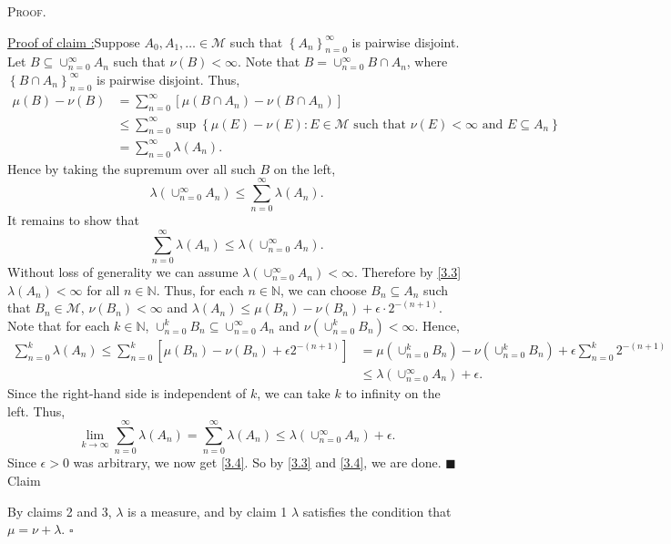 \documentclass[12pt]{article}
\newcounter{ProofCounter}
\newcounter{ClaimCounter}[ProofCounter]
\newenvironment{Proof}{\stepcounter{ProofCounter}\textsc{Proof.}}{\hfill$\square$}
\newenvironment{claim}[1]{\vspace{1mm}\stepcounter{ClaimCounter}\par\noindent\underline{\bf Claim \theClaimCounter:}\space#1}{}
\newenvironment{claimproof}[1]{\par\noindent\underline{Proof of claim \theClaimCounter:}\space#1}{\hfill $\blacksquare$ Claim \theClaimCounter}
\begin{document}
\begin{Proof}
\begin{claimproof}
Suppose $A_{0}, A_{1}, \hdots \in \mathcal{M}$ such that $\left\{ A_{n} \right\}_{n=0}^{\infty}$ is pairwise disjoint. Let $B \subseteq
\cup_{n=0}^{\infty} A_{n}$ such that $\nu(B) < \infty$. Note that $B = \cup_{n=0}^{\infty}B\cap A_{n}$, where $\left\{ B\cap A_{n}
\right\}_{n=0}^{\infty}$ is pairwise disjoint. Thus,
\begin{align*}
\mu(B) - \nu(B) & = \sum_{n=0}^{\infty}\left[ \mu(B\cap A_{n}) - \nu(B\cap A_{n}) \right] \\
& \leq \sum_{n=0}^{\infty}\sup\left\{ 
\mu(E) - \nu(E) : E \in \mathcal{M} \text{ such that } \nu(E) < \infty \text{ and } E \subseteq A_{n} \right\} \\
& = \sum_{n=0}^{\infty}\lambda(A_{n}).
\end{align*}
Hence by taking the supremum over all such $B$ on the left,
\begin{equation}
\lambda\left( \cup_{n=0}^{\infty}A_{n} \right) \leq \sum_{n=0}^{\infty}\lambda(A_{n}).
\label{3.3}
\end{equation}
It remains to show that 
\begin{equation}
\sum_{n=0}^{\infty}\lambda(A_{n}) \leq \lambda\left( \cup_{n=0}^{\infty} A_{n} \right).
\label{3.4}
\end{equation}
Without loss of generality we can assume $\lambda\left( \cup_{n=0}^{\infty}A_{n} \right) < \infty$. 
Therefore by \eqref{3.3} $\lambda(A_{n}) < \infty$ for all $n \in \mathbb{N}$. Thus, for each $n \in \mathbb{N}$, we can choose $B_{n}
\subseteq A_{n}$ such that $B_{n} \in \mathcal{M}$, $\nu(B_{n}) < \infty$ and $\lambda(A_{n}) \leq \mu(B_{n}) - \nu(B_{n}) + \epsilon\cdot
2^{-(n+1)}$. Note that for each $k \in \mathbb{N}$, $\cup_{n=0}^{k}B_{n} \subseteq \cup_{n=0}^{\infty}A_{n}$ and $\nu\left( \cup_{n=0}^{k}B_{n}
\right) < \infty$. Hence,
\begin{align*}
\sum_{n=0}^{k}\lambda(A_{n}) \leq \sum_{n=0}^{k}\left[ \mu(B_{n}) - \nu(B_{n}) + \epsilon 2^{-(n+1)}\right] & = \mu\left( \cup_{n=0}^{k}B_{n} \right)
- \nu\left( \cup_{n=0}^{k}B_{n} \right) + \epsilon\sum_{n=0}^{k}2^{-(n+1)} \\
& \leq \lambda\left( \cup_{n=0}^{\infty}A_{n} \right) + \epsilon.
\end{align*}
Since the right-hand side is independent of $k$, we can take $k$ to infinity on the left. Thus,
\[ \lim_{k\rightarrow\infty}\sum_{n=0}^{\infty}\lambda(A_{n}) = \sum_{n=0}^{\infty}\lambda(A_{n}) \leq \lambda\left( \cup_{n=0}^{\infty}A_{n}
\right) + \epsilon. \]
Since $\epsilon > 0$ was arbitrary, we now get \eqref{3.4}. So by \eqref{3.3} and \eqref{3.4}, we are done.
\end{claimproof}

By claims 2 and 3, $\lambda$ is a measure, and by claim 1 $\lambda$ satisfies the condition that $\mu = \nu + \lambda$.
\end{Proof}
\end{document}
